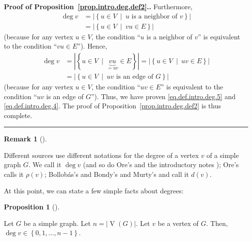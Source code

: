 \documentclass[numbers=enddot,12pt,final,onecolumn,notitlepage]{scrartcl}%
\theoremstyle{definition}
\newtheorem{prop}[theo]{Proposition}
\newenvironment{proposition}[1][]
{\begin{prop}[#1]\begin{leftbar}}
{\end{leftbar}\end{prop}}
\newtheorem{remk}[theo]{Remark}
\newenvironment{remark}[1][]
{\begin{remk}[#1]\begin{leftbar}}
{\end{leftbar}\end{remk}}
\newenvironment{proof}[1][Proof]{\noindent\textbf{#1.} }{\ \rule{0.5em}{0.5em}}
\newcommand{\set}[1]{\left\{ #1 \right\}}
\newcommand{\abs}[1]{\left| #1 \right|}
\newcommand{\verts}[1]{\operatorname{V}\left( #1 \right)}
\begin{document}
\begin{proof}[Proof of Proposition~\ref{prop.intro.deg.def2}.]
Furthermore,
\begin{align*}
\deg v &= \abs{\set{u \in V \ \mid \ u \text{ is a neighbor of } v }} \\
&= \abs{\set{u \in V \ \mid \ vu \in E }}
\end{align*}
(because for any vertex $u \in V$, the condition ``$u$ is a neighbor
of $v$'' is equivalent to the condition ``$vu \in E$''). Hence,
\begin{align*}
\deg v &= \abs{\set{u \in V \ \mid \ \underbrace{vu}_{=uv} \in E }}
= \abs{\set{u \in V \ \mid \ uv \in E }} \\
&= \abs{\set{u \in V \ \mid \ uv \text{ is an edge of } G }}
\end{align*}
(because for any vertex $u \in V$, the condition ``$uv \in E$'' is
equivalent to the condition ``$uv$ is an edge of $G$''). Thus, we
have proven \eqref{eq.def.intro.deg.5} and
\eqref{eq.def.intro.deg.4}. The proof of
Proposition~\ref{prop.intro.deg.def2} is thus complete.
\end{proof}

\begin{remark}
Different sources use different notations for the degree of a
vertex $v$ of a simple graph $G$. We call it $\deg v$ (and so do
Ore's \cite{Ore90} and the introductory notes
\cite{LeLeMe16}); Ore's \cite{Ore74} calls it $\rho\left(v\right)$;
Bollob\'as's \cite{Bollob79} and Bondy's and Murty's
\cite{BonMur08} and \cite{BonMur76} call it $d\left(v\right)$.
\end{remark}

At this point, we can state a few simple facts about degrees:

\begin{proposition} \label{prop.intro.deg.in-set}
Let $G$ be a simple graph. Let $n = \abs{\verts{G}}$. Let $v$ be a
vertex of $G$. Then, $\deg v \in \set{0, 1, \ldots, n-1}$.
\end{proposition}
\end{document}
